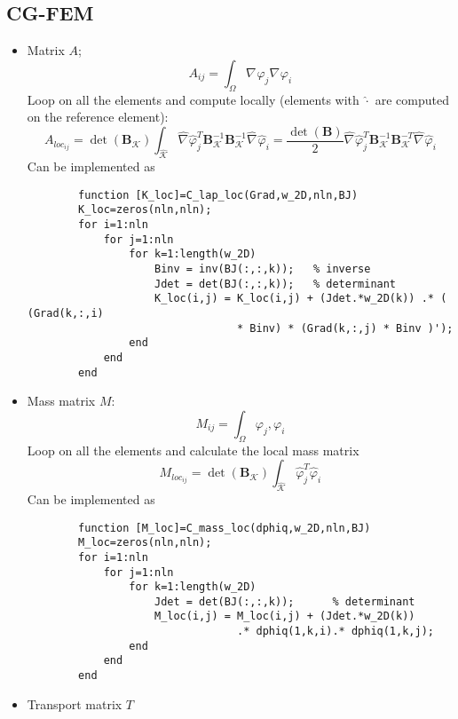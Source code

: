\documentclass[a4paper,11pt]{article}
\theoremstyle{break}
\renewcommand*{\grad}{\nabla\mspace{1mu}}
\newcommand{\vect}[1]{\textbf{#1}}
\let\phi\varphi
\newcommand{\element}{\mathcal{K}}
\numberwithin{equation}{section}
\begin{document}
\subsection*{CG-FEM}
\begin{itemize}
    \item Matrix \(A\);
    \[
        A_{ij} = \int_\Omega \grad \phi_j \grad \phi_i  
    \]
    Loop on all the elements and compute locally (elements with \(\hat{\cdot}\) are computed on the reference element):
    \[
        A_{loc_{ij}} = \det(\vect{B}_\element) \int_{\hat{\element}} \hat{\grad} \hat{\phi}^T_j \vect{B}_\element^{-1} \vect{B}^{-1}_\element \hat{\grad} \hat{\phi}_i = \frac{\det(\vect{B})}{2} \hat{\grad} \hat{\phi}^T_j \vect{B}_\element^{-1} \vect{B}^{-T}_\element \hat{\grad} \hat{\phi}_i
    \]
    Can be implemented as 
    \begin{verbatim}
        function [K_loc]=C_lap_loc(Grad,w_2D,nln,BJ)
        K_loc=zeros(nln,nln);
        for i=1:nln
            for j=1:nln
                for k=1:length(w_2D)
                    Binv = inv(BJ(:,:,k));   % inverse
                    Jdet = det(BJ(:,:,k));   % determinant 
                    K_loc(i,j) = K_loc(i,j) + (Jdet.*w_2D(k)) .* ( (Grad(k,:,i)
                                 * Binv) * (Grad(k,:,j) * Binv )');
                end
            end
        end
    \end{verbatim}
    \item Mass matrix \(M\):
    \[
        M_{ij} = \int_\Omega \phi_j, \phi_i
    \]
    Loop on all the elements and calculate the local mass matrix
    \[
        M_{loc_{ij}} =  \det(\vect{B}_\element) \int_{\hat{\element}} \hat{\phi}^T_j \hat{\phi}_i
    \]
    Can be implemented as
    \begin{verbatim}
        function [M_loc]=C_mass_loc(dphiq,w_2D,nln,BJ)
        M_loc=zeros(nln,nln);
        for i=1:nln
            for j=1:nln
                for k=1:length(w_2D)
                    Jdet = det(BJ(:,:,k));      % determinant 
                    M_loc(i,j) = M_loc(i,j) + (Jdet.*w_2D(k))
                                 .* dphiq(1,k,i).* dphiq(1,k,j);
                end
            end
        end
    \end{verbatim}
    \item Transport matrix \(T\)
    

\end{itemize}
\end{document}
